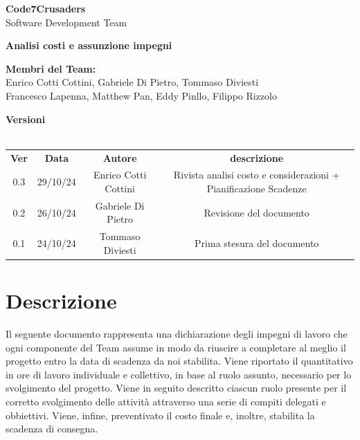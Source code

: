 \documentclass{article}
\begin{document}
\begin{titlepage}
    {\Huge \textbf{Code7Crusaders}}\\
    \vspace{0.5cm}
    {\Large Software Development Team}\\
    \vspace{2cm}
    
    \large \textbf{Analisi costi e assunzione impegni}
    \vspace{5cm}

    \textbf{Membri del Team:}\\
    Enrico Cotti Cottini, Gabriele Di Pietro, Tommaso Diviesti \\
    Francesco Lapenna, Matthew Pan, Eddy Pinllo, Filippo Rizzolo \\
    \vspace{0.5cm}
    
    \vspace{1cm}
\end{titlepage}

\newpage
\begin{center}
    \newline
    \textbf{Versioni}
    \\
    \\
    \begin{tabular}{|c|c|c|c|}
        \hline
        \textbf{Ver} & \textbf{Data} & \textbf{Autore} & \textbf{descrizione}\\
        0.3 & 29/10/24 & Enrico Cotti Cottini & Rivista analisi costo e considerazioni + Pianificazione Scadenze  \\
        \hline
        0.2 & 26/10/24 & Gabriele Di Pietro & Revisione del documento \\
        \hline
        0.1 & 24/10/24 & Tommaso Diviesti & Prima stesura del documento \\
        \hline
    \end{tabular}
\end{center}

\newpage
\tableofcontents
\newpage

\section{Descrizione}
Il seguente documento rappresenta una dichiarazione degli impegni di lavoro che ogni componente del Team assume in modo da 
riuscire a completare al meglio il progetto entro la data di scadenza da noi stabilita. Viene riportato il quantitativo in 
ore di lavoro individuale e collettivo, in base al ruolo assunto, necessario per lo svolgimento del progetto. Viene in seguito 
descritto ciascun ruolo presente per il corretto svolgimento delle attività attraverso una serie di compiti delegati e obbiettivi. 
Viene, infine, preventivato il costo finale e, inoltre, stabilita la scadenza di consegna.
\newpage
\end{document}
